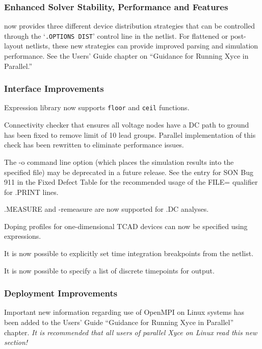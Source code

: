 \documentclass{article}
\begin{document}
\subsubsection*{Enhanced Solver Stability, Performance and Features}
\begin{XyceItemize}
 \item \Xyce{} now provides three different device distribution strategies that
      can be controlled through the `\texttt{.OPTIONS DIST}' control line in
      the netlist.  For flattened or post-layout netlists, these new strategies
      can provide improved parsing and simulation performance.  See the Users'
      Guide chapter on ``Guidance for Running Xyce in Parallel.''
 \end{XyceItemize}

\subsubsection*{Interface Improvements}
\begin{XyceItemize}
  \item Expression library now supports \texttt{floor} and \texttt{ceil} functions.
  \item Connectivity checker that ensures all voltage nodes have a DC path to
       ground has been fixed to remove limit of 10 lead groups.  Parallel
       implementation of this check has been rewritten to eliminate performance
       issues.
  \item The -o command line option (which places the simulation results into
       the specified file) may be deprecated in a future release.  See the entry 
       for SON Bug 911 in
       the Fixed Defect Table for the recommended usage of the FILE= qualifier
       for .PRINT lines.
  \item .MEASURE and -remeasure are now supported for .DC analyses.
  \item Doping profiles for one-dimensional TCAD devices can now be specified
       using expressions.
  \item It is now possible to explicitly set time integration breakpoints from
       the netlist.
  \item It is now possible to specify a list of discrete timepoints for output.
\end{XyceItemize}

\subsubsection*{Deployment Improvements}
\begin{XyceItemize}
  \item Important new information regarding use of OpenMPI on Linux systems has
       been added to the Users' Guide ``Guidance for Running Xyce in Parallel''
       chapter.  \emph{It is recommended that all users of parallel Xyce on Linux
       read this new section!}
\end{XyceItemize}
\end{document}
